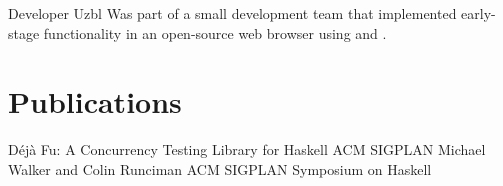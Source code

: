 \documentclass[a4paper]{barrucadu-cv}
\begin{document}
  {Developer}
  {Uzbl}
  {}
  {Was part of a small development team that implemented early-stage
    functionality in an open-source web browser using  and
    .}

\section{Publications}

  {Déjà Fu: A Concurrency Testing Library for Haskell}
  {ACM SIGPLAN}
  {Michael Walker and Colin Runciman}
  {ACM SIGPLAN Symposium on Haskell}
\end{document}
